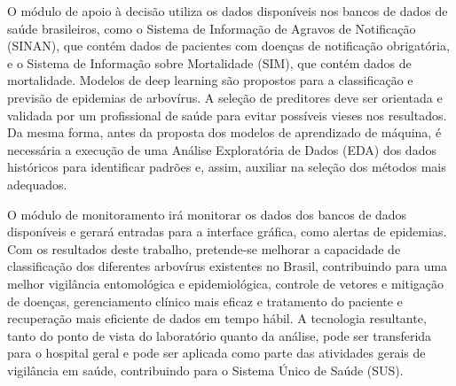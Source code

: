 \documentclass[12pt]{article}
\begin{document}
O módulo de apoio à decisão utiliza os dados disponíveis nos bancos de dados de saúde brasileiros, como o Sistema de Informação de Agravos de Notificação (SINAN), que contém dados de pacientes com doenças de notificação obrigatória, e o Sistema de Informação sobre Mortalidade (SIM), que contém dados de mortalidade. Modelos de deep learning são propostos para a classificação e previsão de epidemias de arbovírus. A seleção de preditores deve ser orientada e validada por um profissional de saúde para evitar possíveis vieses nos resultados. Da mesma forma, antes da proposta dos modelos de aprendizado de máquina, é necessária a execução de uma Análise Exploratória de Dados (EDA) dos dados históricos para identificar padrões e, assim, auxiliar na seleção dos métodos mais adequados. 

O módulo de monitoramento irá monitorar os dados dos bancos de dados disponíveis e gerará entradas para a interface gráfica, como alertas de epidemias. Com os resultados deste trabalho, pretende-se melhorar a capacidade de classificação dos diferentes arbovírus existentes no Brasil, contribuindo para uma melhor vigilância entomológica e epidemiológica, controle de vetores e mitigação de doenças, gerenciamento clínico mais eficaz e tratamento do paciente e recuperação mais eficiente de dados em tempo hábil. A tecnologia resultante, tanto do ponto de vista do laboratório quanto da análise, pode ser transferida para o hospital geral e pode ser aplicada como parte das atividades gerais de vigilância em saúde, contribuindo para o Sistema Único de Saúde (SUS).






\end{document}
